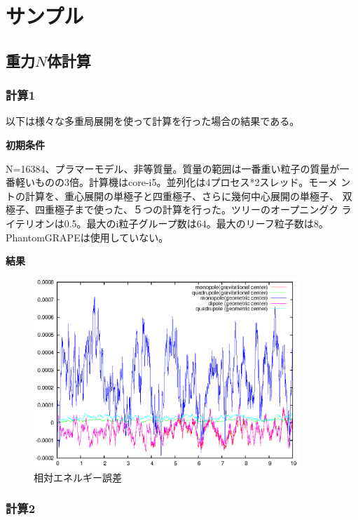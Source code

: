 \section{サンプル}
\label{sec:sample}

\subsection{重力$N$体計算}

\subsubsection{計算1}

以下は様々な多重局展開を使って計算を行った場合の結果である。

{\bf 初期条件}

N=16384、プラマーモデル、非等質量。質量の範囲は一番重い粒子の質量が一
番軽いものの3倍。計算機はcore-i5。並列化は4プロセス*2スレッド。モーメ
ントの計算を、重心展開の単極子と四重極子、さらに幾何中心展開の単極子、
双極子、四重極子まで使った、５つの計算を行った。ツリーのオープニングク
ライテリオンは0.5。最大のi粒子グループ数は64。最大のリーフ粒子数は8。
PhantomGRAPEは使用していない。

{\bf 結果}

\begin{figure}
  \begin{center}
\includegraphics[width=10cm]{fig/relative_energy_error_various_center.eps}
  \end{center}
  \caption{相対エネルギー誤差}
  \label{fig:relative_energy_error_various_center}
\end{figure}

\subsubsection{計算2}

